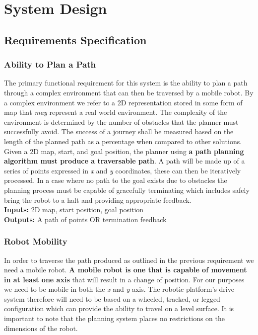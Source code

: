 \chapter{System Design}


\section{Requirements Specification}

\subsection{Ability to Plan a Path}
\noindent
The primary functional requirement for this system is the ability to plan a path through a complex environment that can then be traversed by a mobile robot. By a complex environment we refer to a 2D representation stored in some form of map that \textit{may} represent a real world environment. The complexity of the environment is determined by the number of obstacles that the planner must successfully avoid. The success of a journey shall be measured based on the length of the planned path as a percentage when compared to other solutions. \\

\noindent
Given a 2D map, start, and goal position, the planner using \textbf{a path planning algorithm must produce a traversable path}. A path will be made up of a series of points expressed in \textit{x} and \textit{y} coordinates, these can then be iteratively processed. In a case where no path to the goal exists due to obstacles the planning process must be capable of gracefully terminating which includes safely bring the robot to a halt and providing appropriate feedback. \\

\noindent
\textbf{Inputs:} 2D map, start position, goal position \\
\textbf{Outputs:} A path of points OR termination feedback

\newpage

\subsection{Robot Mobility}
\noindent
In order to traverse the path produced as outlined in the previous requirement we need a mobile robot. \textbf{A mobile robot is one that is capable of movement in at least one axis} that will result in a change of position. For our purposes we need to be mobile in both the \textit{x} and \textit{y} axis. The robotic platform's drive system therefore will need to be based on a wheeled, tracked, or legged configuration which can provide the ability to travel on a level surface. It is important to note that the planning system places no restrictions on the dimensions of the robot. \\ 

